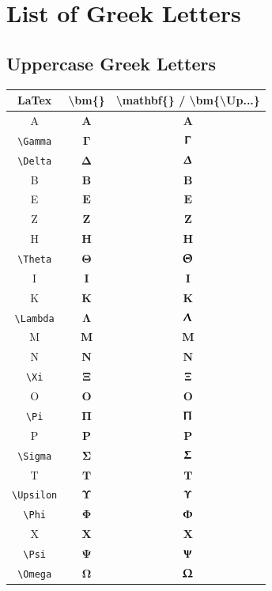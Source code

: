 \documentclass[12pt,a4paper]{article}
\begin{document}
\newpage

\section*{List of Greek Letters}

\subsection*{Uppercase Greek Letters}

\begin{longtable}{|c|c|c|}
\hline
\textbf{LaTex} & \textbf{\textbackslash{}bm\{\}} & \textbf{\textbackslash{}mathbf\{\} / \textbackslash{}bm\{\textbackslash{}Up...\}} \\
\hline
A & $\bm{A}$ & $\mathbf{A}$ \\ %
\verb|\Gamma| & $\bm{\Gamma}$ & $\bm{\Upgamma}$ \\ %
\verb|\Delta| & $\bm{\Delta}$ & $\bm{\Updelta}$ \\ %
B & $\bm{B}$ & $\mathbf{B}$ \\ %
E & $\bm{E}$ & $\mathbf{E}$ \\ %
Z & $\bm{Z}$ & $\mathbf{Z}$ \\ %
H & $\bm{H}$ & $\mathbf{H}$ \\ %
\verb|\Theta| & $\bm{\Theta}$ & $\bm{\Uptheta}$ \\ %
I & $\bm{I}$ & $\mathbf{I}$ \\ %
K & $\bm{K}$ & $\mathbf{K}$ \\ %
\verb|\Lambda| & $\bm{\Lambda}$ & $\bm{\Uplambda}$ \\ %
M & $\bm{M}$ & $\mathbf{M}$ \\ %
N & $\bm{N}$ & $\mathbf{N}$ \\ %
\verb|\Xi| & $\bm{\Xi}$ & $\bm{\Upxi}$ \\ %
O & $\bm{O}$ & $\mathbf{O}$ \\ %
\verb|\Pi| & $\bm{\Pi}$ & $\bm{\Uppi}$ \\ %
P & $\bm{P}$ & $\mathbf{P}$ \\ %
\verb|\Sigma| & $\bm{\Sigma}$ & $\bm{\Upsigma}$ \\ %
T & $\bm{T}$ & $\mathbf{T}$ \\ %
\verb|\Upsilon| & $\bm{\Upsilon}$ & $\bm{\Upupsilon}$ \\ %
\verb|\Phi| & $\bm{\Phi}$ & $\bm{\Upphi}$ \\ %
X & $\bm{X}$ & $\mathbf{X}$ \\ %
\verb|\Psi| & $\bm{\Psi}$ & $\bm{\Uppsi}$ \\ %
\verb|\Omega| & $\bm{\Omega}$ & $\bm{\Upomega}$ \\ %
\hline
\end{longtable}
\end{document}
